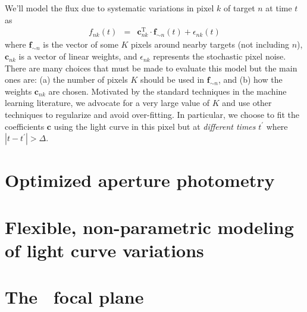 \documentclass[letterpaper,12pt,preprint]{hack_aastex}
\newcommand{\bvec}[1]{{\ensuremath{{\boldsymbol{#1}}}}}
\begin{document}
We'll model the flux due to systematic variations in pixel $k$ of target
$n$ at time $t$ as
\begin{eqnarray}
f_{nk}(t) &=& \bvec{c}_{nk}^\mathrm{T}\cdot\bvec{f}_{\sim n}(t)
              + \epsilon_{nk}(t)
\end{eqnarray}
where $\bvec{f}_{\sim n}$ is the vector of some $K$ pixels around nearby
targets (not including $n$), $\bvec{c}_{nk}$ is a vector of linear weights,
and $\epsilon_{nk}$ represents the stochastic pixel noise.
There are many choices that must be made to evaluate this model but the main
ones are: (a) the number of pixels $K$ should be used in $\bvec{f}_{\sim n}$,
and (b) how the weights $\bvec{c}_{nk}$ are chosen.
Motivated by the standard techniques in the machine learning literature, we
advocate for a very large value of $K$ and use other techniques to regularize
and avoid over-fitting.
In particular, we choose to fit the coefficients $\bvec{c}$ using the light
curve in this pixel but at \emph{different times} $t^\prime$ where
$|t-t^\prime| > \Delta$.


\section{Optimized aperture photometry}

\section{Flexible, non-parametric modeling of light curve variations}

\section{The \Kepler\ focal plane}
\end{document}
